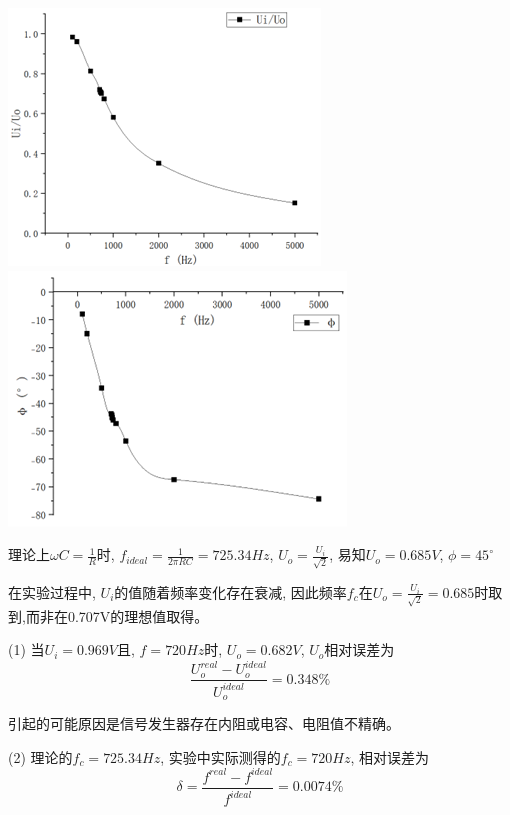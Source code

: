 \documentclass[a4paper]{article}
\begin{document}
    \includegraphics[height=0.20\textheight]{12}
    \includegraphics[height=0.20\textheight]{13}

    \hspace{1.5cm}{\small 图a 幅频特性图}\hspace{2.8cm}{\small 图b 相频特性图}


    {理论上$\omega C=\frac{1}{R}$时, $f_{ideal}=\frac{1}{2\pi RC}=725.34Hz$, $U_{o}=\frac{U_{i}}{\sqrt{2}}$, 易知$U_{o}=0.685V$, $\phi=45^{\circ}$}

    {在实验过程中, $U_{i}$的值随着频率变化存在衰减, 因此频率$f_c$在$U_{o}=\frac{U_{i}}{\sqrt{2}}=0.685$时取到,而非在0.707V的理想值取得。}

    \vspace{0.5cm}


    {(1) 当$U_{i}=0.969V$且, $f=720Hz$时, $U_{o}=0.682V$, $U_{o}$相对误差为\[\frac{U_{o}^{real}-U_{o}^{ideal}}{U_{o}^{ideal}}=0.348\%\]}

    {引起的可能原因是信号发生器存在内阻或电容、电阻值不精确。}

    {(2) 理论的$f_c=725.34Hz$, 实验中实际测得的$f_c=720Hz$, 相对误差为\[\delta=\frac{f^{real}-f^{ideal}}{f^{ideal}}=0.0074\%\]}
\end{document}
